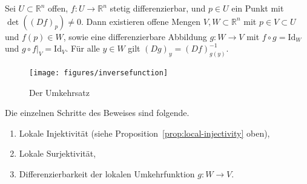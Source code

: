 \documentclass[../main.tex]{subfiles}
\begin{document}
\begin{theorem}[Umkehrsatz]
  Sei $U \subset \mathbb{R}^n$ offen, $f \colon U \to \mathbb{R}^n$
  stetig differenzierbar, und $p \in U$ ein Punkt mit
  $\det( {(Df)}_p ) \neq 0$.
  Dann existieren offene Mengen $V, W \subset \mathbb{R}^n$
  mit
  $p \in V \subset U$ und
  $f(p) \in W$,
  sowie eine differenzierbare Abbildung $g \colon W \to V$ mit
  $f \circ g = \text{Id}_W$ und $g \circ f|_V = \text{Id}_V$.
  Für alle $y \in W$ gilt ${(Dg)}_y = {(Df)}_{g(y)}^{-1}$.
\end{theorem}

\begin{figure}[htb]
  \centering
  \texttt{[image: figures/inversefunction]}
  \caption{Der Umkehrsatz}%
  \label{fig:inversefunction}
\end{figure}

Die einzelnen Schritte des Beweises sind folgende.
\begin{enumerate}[(1)]
  \item Lokale Injektivität (siehe
    Proposition~\ref{prop:local-injectivity} oben),
  \item Lokale Surjektivität,
  \item Differenzierbarkeit der lokalen Umkehrfunktion $g \colon W \to V$.
\end{enumerate}
\end{document}
